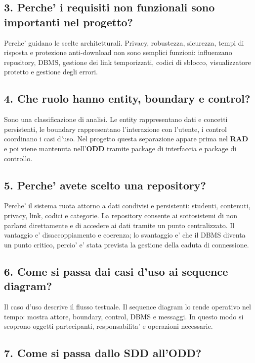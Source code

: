 ﻿\documentclass[11pt,a4paper]{article}
\newcommand{\doc}[1]{\textbf{#1}}
\begin{document}
\subsection*{3. Perche' i requisiti non funzionali sono importanti nel progetto?}

Perche' guidano le scelte architetturali. Privacy, robustezza, sicurezza, tempi di risposta
e protezione anti-download non sono semplici funzioni: influenzano repository, DBMS,
gestione dei link temporizzati, codici di sblocco, visualizzatore protetto e gestione degli
errori.

\subsection*{4. Che ruolo hanno entity, boundary e control?}

Sono una classificazione di analisi. Le entity rappresentano dati e concetti persistenti,
le boundary rappresentano l'interazione con l'utente, i control coordinano i casi d'uso.
Nel progetto questa separazione appare prima nel \doc{RAD} e poi viene mantenuta
nell'\doc{ODD} tramite package di interfaccia e package di controllo.

\subsection*{5. Perche' avete scelto una repository?}

Perche' il sistema ruota attorno a dati condivisi e persistenti: studenti, contenuti,
privacy, link, codici e categorie. La repository consente ai sottosistemi di non parlarsi
direttamente e di accedere ai dati tramite un punto centralizzato. Il vantaggio e'
disaccoppiamento e coerenza; lo svantaggio e' che il DBMS diventa un punto critico,
percio' e' stata prevista la gestione della caduta di connessione.

\subsection*{6. Come si passa dai casi d'uso ai sequence diagram?}

Il caso d'uso descrive il flusso testuale. Il sequence diagram lo rende operativo nel tempo:
mostra attore, boundary, control, DBMS e messaggi. In questo modo si scoprono oggetti
partecipanti, responsabilita' e operazioni necessarie.

\subsection*{7. Come si passa dallo SDD all'ODD?}
\end{document}
